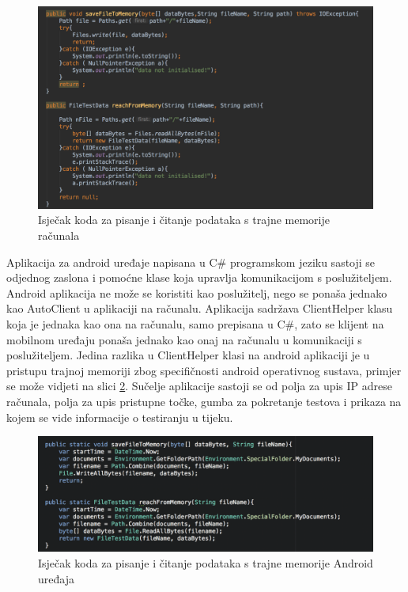 \documentclass[times, utf8, zavrsni, square]{fer}
\begin{document}
\begin{figure}[h!]
    \centering
    \includegraphics[width=1\textwidth]{memory_pc}
    \caption{Isječak koda za pisanje i čitanje podataka s trajne memorije računala}
    \label{fig:memory_pc}
\end{figure}

Aplikacija za android uređaje napisana u C\# programskom jeziku sastoji se od\linebreak jednog zaslona i pomoćne klase koja upravlja komunikacijom s poslužiteljem. 
Android aplikacija ne može se koristiti kao poslužitelj, nego se ponaša jednako kao AutoClient u aplikaciji na računalu.
Aplikacija sadržava ClientHelper klasu koja je jednaka kao ona na računalu, samo prepisana u C\#, zato se klijent na mobilnom uređaju ponaša jednako kao onaj na računalu u komunikaciji s poslužiteljem.
Jedina razlika u ClientHelper klasi na android aplikaciji je u pristupu trajnoj memoriji zbog specifičnosti android operativnog sustava, primjer se može vidjeti na slici \ref{fig:memory_andr}.
Sučelje aplikacije sastoji se od polja za upis IP adrese računala, polja za upis pristupne točke, gumba za pokretanje testova i prikaza na kojem se vide informacije o testiranju u tijeku.
\begin{figure}[h!]
    \centering
    \includegraphics[width=1\textwidth]{memory_andr}
    \caption{Isječak koda za pisanje i čitanje podataka s trajne memorije Android uređaja}
    \label{fig:memory_andr}
\end{figure}
\end{document}
